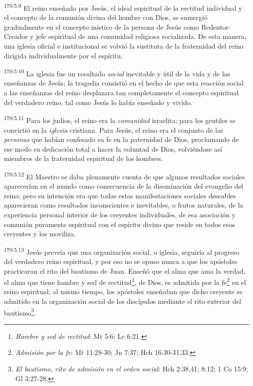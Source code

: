 \par 
\textsuperscript{170:5.9} El reino enseñado por Jesús, el ideal espiritual de la rectitud individual y el concepto de la comunión divina del hombre con Dios, se sumergió gradualmente en el concepto místico de la persona de Jesús como Redentor-Creador y jefe espiritual de una comunidad religiosa socializada. De esta manera, una iglesia oficial e institucional se volvió la sustituta de la fraternidad del reino dirigida individualmente por el espíritu.

\par 
\textsuperscript{170:5.10} La iglesia fue un resultado \textit{social} inevitable y útil de la vida y de las enseñanzas de Jesús; la tragedia consistió en el hecho de que esta reacción social a las enseñanzas del reino desplazara tan completamente el concepto espiritual del verdadero reino, tal como Jesús lo había enseñado y vivido.

\par 
\textsuperscript{170:5.11} Para los judíos, el reino era la \textit{comunidad} israelita; para los gentiles se convirtió en la \textit{iglesia} cristiana. Para Jesús, el reino era el conjunto de las \textit{personas} que habían confesado su fe en la paternidad de Dios, proclamando de ese modo su dedicación total a hacer la voluntad de Dios, volviéndose así miembros de la fraternidad espiritual de los hombres.

\par 
\textsuperscript{170:5.12} El Maestro se daba plenamente cuenta de que algunos resultados sociales aparecerían en el mundo como consecuencia de la diseminación del evangelio del reino; pero su intención era que todas estas manifestaciones sociales deseables aparecieran como resultados inconscientes e inevitables, o frutos naturales, de la experiencia personal interior de los creyentes individuales, de esa asociación y comunión puramente espiritual con el espíritu divino que reside en todos esos creyentes y los moviliza.

\par 
\textsuperscript{170:5.13} Jesús preveía que una organización social, o iglesia, seguiría al progreso del verdadero reino espiritual, y por eso no se opuso nunca a que los apóstoles practicaran el rito del bautismo de Juan. Enseñó que el alma que ama la verdad, el alma que tiene hambre y sed de rectitud\footnote{\textit{Hambre y sed de rectitud}: Mt 5:6; Lc 6:21.}, de Dios, es admitida por la fe\footnote{\textit{Admisión por la fe}: Mt 11:28-30; Jn 7:37; Hch 16:30-31,33.} en el reino espiritual; al mismo tiempo, los apóstoles enseñaban que dicho creyente es admitido en la organización social de los discípulos mediante el rito exterior del bautismo\footnote{\textit{El bautismo, rito de admisión en el orden social}: Hch 2:38,41; 8:12; 1 Co 15:9; Gl 3:27-28.}.

